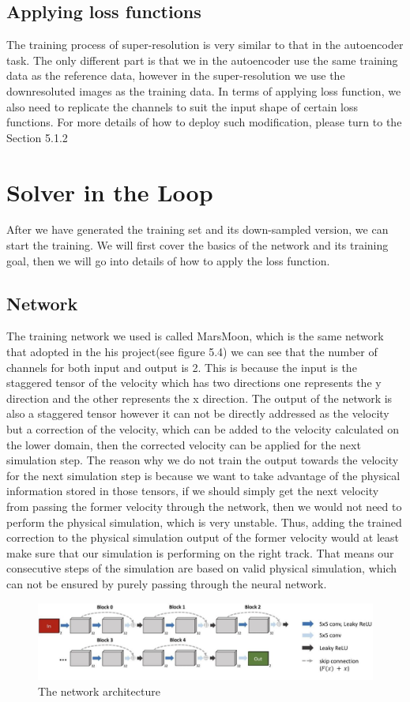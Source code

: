 \documentclass[a4paper,12pt,twoside]{report}
\begin{document}
\subsection{Applying loss functions}
The training process of super-resolution is very similar to that in the autoencoder task. The only different part is that we in the autoencoder use the same training data as the reference data, however in the super-resolution we use the downresoluted images as the training data. In terms of applying loss function, we also need to replicate the channels to suit the input shape of certain loss functions. For more details of how to deploy such modification, please turn to the Section 5.1.2


\section{Solver in the Loop}
After we have generated the training set and its down-sampled version, we can start the training. We will first cover the basics of the network and its training goal, then we will go into details of how to apply the loss function.
\subsection{Network}
The training network we used is called MarsMoon, which is the same network that \cite{um2020sol} adopted in the his project(see figure 5.4) we can see that the number of channels for both input and output is 2. This is because the input is the staggered tensor of the velocity which has two directions one represents the y direction and the other represents the x direction. The output of the network is also a staggered tensor however it can not be directly addressed as the velocity but a correction of the velocity, which can be added to the velocity calculated on the lower domain, then the corrected velocity can be applied for the next simulation step. The reason why we do not train the output towards the velocity for the next simulation step is because we want to take advantage of the physical information stored in those tensors, if we should simply get the next velocity from passing the former velocity through the network, then we would not need to perform the physical simulation, which is very unstable. Thus, adding the trained correction to the physical simulation output of the former velocity would at least make sure that our simulation is performing on the right track. That means our consecutive steps of the simulation are based on valid physical simulation, which can not be ensured by purely passing through the neural network.
\begin{figure}
\centering
\includegraphics[width=1.0\textwidth]{marsmoon.jpg}
\caption{The network architecture\cite{um2020sol}}
\end{figure}
\end{document}

